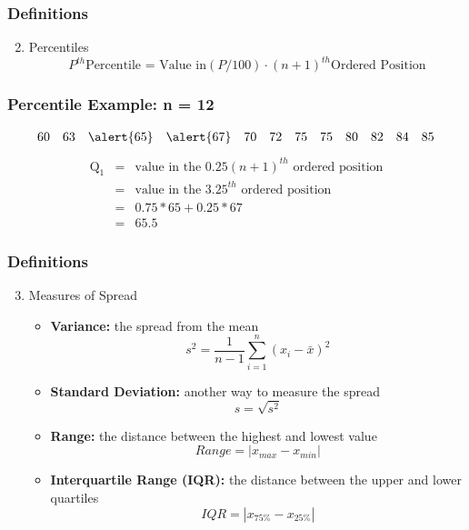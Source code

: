 \documentclass{beamer}
\begin{document}
\begin{frame}
\frametitle{Definitions}
	\begin{enumerate}
	\setcounter{enumi}{1}
		\item Percentiles
		$$
		P^{th} \text{Percentile = Value in}  \left(P/100\right)\cdot (n+1)^{th} \text{Ordered 					Position}
		$$
	\end{enumerate}
\end{frame}

\begin{frame}
\frametitle{Percentile Example: n = 12}
	$$
	\begin{array}{cccccccccccc}
		60 & 63 & \alert{65} & \alert{67} & 70 & 72 & 75 & 75 & 80 & 82 & 84 & 85
	\end{array}
	$$
	\begin{eqnarray*}
		\mbox{Q}_1 &=& \mbox{value in the } 0.25(n+1)^{th}\mbox{ ordered position}\\
			&=& \mbox{value in the } 3.25^{th}\mbox{ ordered position}\\
			&=& 0.75 * 65 + 0.25 * 67\\
			&=& 65.5
	\end{eqnarray*}
\end{frame}

\begin{frame}
\frametitle{Definitions}
	\begin{enumerate}
	\setcounter{enumi}{2}
		\item Measures of Spread
		\begin{itemize}
			\item \textbf{Variance:} the spread from the mean
			$$
			s^2 = \frac{1}{n-1} \sum_{i = 1}^n (x_i - \bar{x})^2
			$$
			\item \textbf{Standard Deviation:} another way to measure the spread
			$$
			s = \sqrt{s^2}
			$$
			\item \textbf{Range:} the distance between the highest and lowest value
			$$
			Range = \left| x_{max} - x_{min} \right|
			$$
			\item \textbf{Interquartile Range (IQR):} the distance between the upper and lower 					quartiles
			$$
			IQR = \left| x_{75\%} - x_{25\%} \right|
			$$
		\end{itemize}
	\end{enumerate}
\end{frame}
\end{document}

